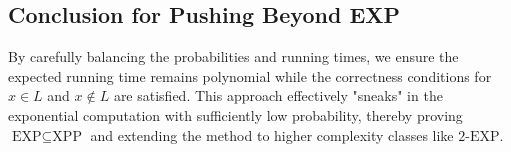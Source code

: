 \documentclass{article}
\begin{document}
\subsection*{Conclusion for Pushing Beyond EXP}

By carefully balancing the probabilities and running times, we ensure the expected running time remains polynomial while the correctness conditions for $x \in L$ and $x \not\in L$ are satisfied. This approach effectively "sneaks" in the exponential computation with sufficiently low probability, thereby proving \(\text{EXP} \subseteq \text{XPP}\) and extending the method to higher complexity classes like \(\text{2-EXP}\).
\end{document}

